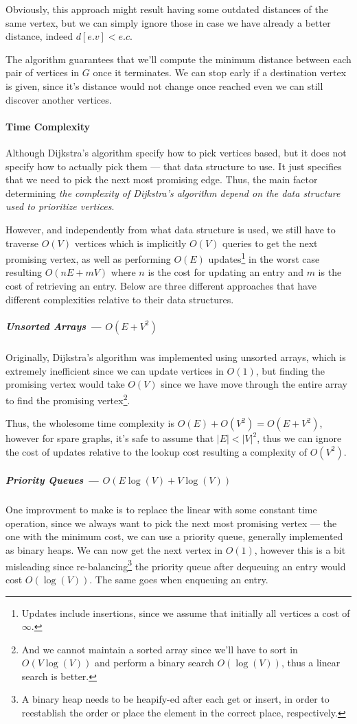 \documentclass[12pt]{article}
\begin{document}
Obviously, this approach might result having some outdated distances of the same vertex, but we can simply ignore those in case we have already a better distance, indeed $d[e.v] < e.c$.

The algorithm guarantees that we'll compute the minimum distance between each pair of vertices in $G$ once it terminates. We can stop early if a destination vertex is given, since it's distance would not change once reached even we can still discover another vertices.

\paragraph{Time Complexity} Although Dijkstra's algorithm specify how to pick vertices based, but it does not specify how to actually pick them --- that data structure to use. It just specifies that we need to pick the next most promising edge. Thus, the main factor determining \textit{the complexity of Dijkstra's algorithm depend on the data structure used to prioritize vertices}.

However, and independently from what data structure is used, we still have to traverse $O(V)$ vertices which is implicitly $O(V)$ queries to get the next promising vertex, as well as performing $O(E)$ updates\footnote{Updates include insertions, since we assume that initially all vertices a cost of $\infty$.} in the worst case resulting $O(nE + mV)$ where $n$ is the cost for updating an entry and $m$ is the cost of retrieving an entry. Below are three different approaches that have different complexities relative to their data structures.

\subparagraph{Unsorted Arrays --- $O(E + V^2)$} Originally, Dijkstra's algorithm was implemented using unsorted arrays, which is extremely inefficient since we can update vertices in $O(1)$, but finding the promising vertex would take $O(V)$ since we have move through the entire array to find the promising vertex\footnote{And we cannot maintain a sorted array since we'll have to sort in $O(V\log(V))$ and perform a binary search $O(\log(V))$, thus a linear search is better.}.

Thus, the wholesome time complexity is $O(E) + O(V^2) = O(E + V^2)$, however for spare graphs, it's safe to assume that $|E| < |V|^2$, thus we can ignore the cost of updates relative to the lookup cost resulting a complexity of $O(V^2)$.

\subparagraph{Priority Queues --- $O(E\log(V) + V\log(V))$} One improvment to make is to replace the linear with some constant time operation, since we always want to pick the next most promising vertex --- the one with the minimum cost, we can use a priority queue, generally implemented as binary heaps. We can now get the next vertex in $O(1)$, however this is a bit misleading since re-balancing\footnote{A binary heap needs to be heapify-ed after each get or insert, in order to reestablish the order or place the element in the correct place, respectively.} the priority queue after dequeuing an entry would cost $O(\log(V))$. The same goes when enqueuing an entry.
\end{document}
